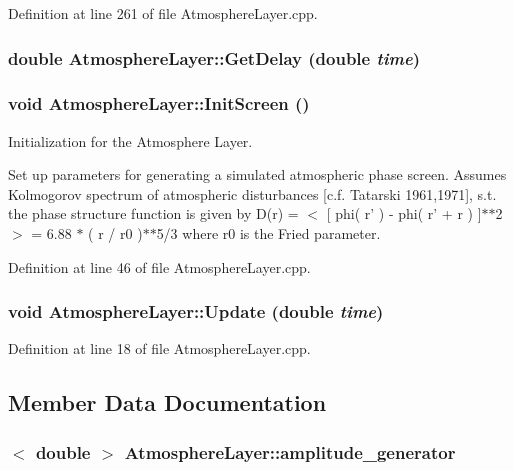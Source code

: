Definition at line 261 of file AtmosphereLayer.cpp.

\hypertarget{classAtmosphereLayer_ab0728692549bca3836385bf561974890}{
\subsubsection[{GetDelay}]{\setlength{\rightskip}{0pt plus 5cm}double AtmosphereLayer::GetDelay (double {\em time})}}
\label{classAtmosphereLayer_ab0728692549bca3836385bf561974890}
\hypertarget{classAtmosphereLayer_ac74b582d0e4cbf31979eedebf5832c35}{
\subsubsection[{InitScreen}]{\setlength{\rightskip}{0pt plus 5cm}void AtmosphereLayer::InitScreen ()}}
\label{classAtmosphereLayer_ac74b582d0e4cbf31979eedebf5832c35}


Initialization for the Atmosphere Layer. 

Set up parameters for generating a simulated atmospheric phase screen. Assumes Kolmogorov spectrum of atmospheric disturbances \mbox{[}c.f. Tatarski 1961,1971\mbox{]}, s.t. the phase structure function is given by D(r) = $<$ \mbox{[} phi( r' ) -\/ phi( r' + r ) \mbox{]}$\ast$$\ast$2 $>$ = 6.88 $\ast$ ( r / r0 )$\ast$$\ast$5/3 where r0 is the Fried parameter. 

Definition at line 46 of file AtmosphereLayer.cpp.

\hypertarget{classAtmosphereLayer_a8ad3f0ff42e11f22d3b1585958f606fc}{
\subsubsection[{Update}]{\setlength{\rightskip}{0pt plus 5cm}void AtmosphereLayer::Update (double {\em time})}}
\label{classAtmosphereLayer_a8ad3f0ff42e11f22d3b1585958f606fc}


Definition at line 18 of file AtmosphereLayer.cpp.



\subsection{Member Data Documentation}
\hypertarget{classAtmosphereLayer_a9e216966fd99b419c0a92243500b7aeb}{
\subsubsection[{amplitude\_\-generator}]{$<$ double $>$ {\bf AtmosphereLayer::amplitude\_\-generator}}}
\label{classAtmosphereLayer_a9e216966fd99b419c0a92243500b7aeb}


